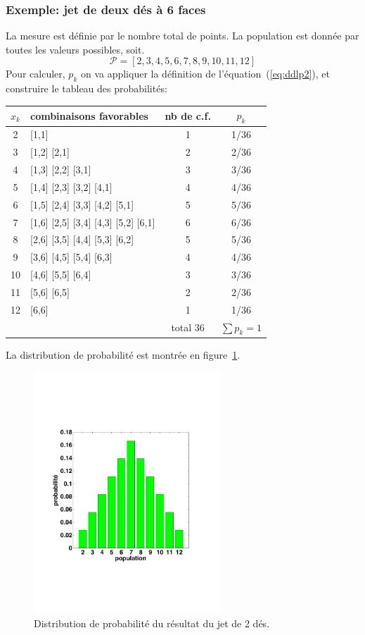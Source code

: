 \subsubsection*{Exemple: jet de deux dés à 6 faces}

La mesure est définie par le nombre total de points. La population est donnée par toutes les valeurs possibles, soit.
$$
\mathcal{P}=[2,3,4,5,6,7,8,9,10,11,12]
$$
Pour calculer, $p_k$ on va appliquer la définition de l'équation~(\ref{eq:ddlp2}), et construire le tableau des probabilités:
\begin{center}
\begin{tabular}{clcc}
$x_k$ & combinaisons favorables & nb de c.f. & $p_k$ \\\hline
 2 & [1,1] & 1 & 1/36 \\
 3 & [1,2] [2,1] & 2 & 2/36\\
 4 & [1,3] [2,2] [3,1] & 3 & 3/36 \\
 5 & [1,4] [2,3] [3,2] [4,1] & 4 & 4/36 \\
 6 & [1,5] [2,4] [3,3] [4,2] [5,1] & 5 & 5/36 \\
 7 & [1,6] [2,5] [3,4] [4,3] [5,2] [6,1] & 6 & 6/36 \\
 8 & [2,6] [3,5] [4,4] [5,3] [6,2] & 5 & 5/36 \\
 9 & [3,6] [4,5] [5,4] [6,3] & 4 & 4/36 \\
10 & [4,6] [5,5] [6,4] & 3 & 3/36 \\
11 & [5,6] [6,5] & 2 & 2/36 \\
12 & [6,6] & 1 & 1/36 \\\hline
 & & total 36 & $\sum p_k=1$
\end{tabular}
\end{center}
La distribution de probabilité est montrée en figure~\ref{fig:ddjddd}.
\begin{figure}[h]
   \centering
   \includegraphics[width=7cm]{assets/figures/Serie2_exe01fig1.pdf}
   \caption{Distribution de probabilité du résultat du jet de 2 dés.}
   \label{fig:ddjddd}
\end{figure}

